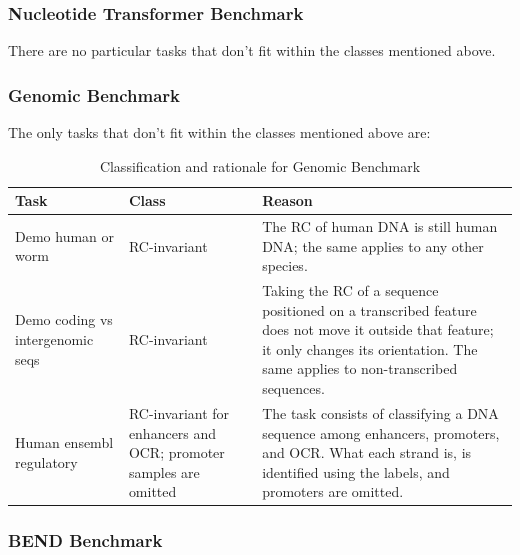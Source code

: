 \documentclass[   ]{article}
\begin{document}
\subsubsection{Nucleotide Transformer Benchmark}
There are no particular tasks that don't fit within the classes mentioned above.

\subsubsection{Genomic Benchmark}
The only tasks that don't fit within the classes mentioned above are:
\begin{table}[htbp]
	\centering
	\caption{Classification and rationale for Genomic Benchmark}
	
	\begin{tabularx}{\linewidth}{p{3cm} p{3cm} X}
		
		\toprule
		
		Task & Class & Reason \\
		
		\midrule
		
		Demo human or worm & RC-invariant & The RC of human DNA is still human DNA; the same applies to any other species. \\
		
		\midrule
		
		Demo coding vs intergenomic seqs & RC-invariant & Taking the RC of a sequence positioned on a transcribed feature does not move it outside that feature; it only changes its orientation. The same applies to non-transcribed sequences. \\
		
		\midrule
		
		Human ensembl regulatory & RC-invariant for enhancers and OCR; promoter samples are omitted & The task consists of classifying a DNA sequence among enhancers, promoters, and OCR. What each strand is, is identified using the labels, and promoters are omitted. \\
		
		\bottomrule
		
	\end{tabularx}
\end{table} 

\subsubsection{BEND Benchmark}
\end{document}
